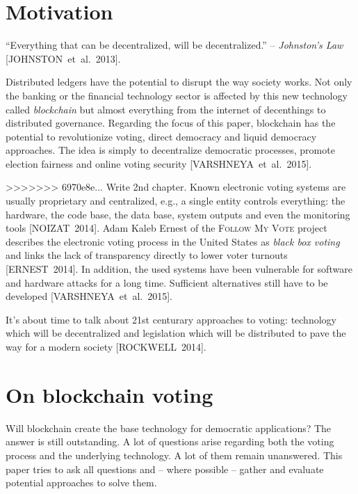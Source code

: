 \documentclass[9pt,oneside]{amsart}
\begin{document}
\begin{multicols}{2}
\section{Motivation}\label{sec:motivation}
\enquote{Everything that can be decentralized, will be decentralized.} -- \textit{Johnston's Law} [JOHNSTON~et~al.~2013].\par
Distributed ledgers have the potential to disrupt the way society works. Not only the banking or the financial technology sector is affected by this new technology called \textit{blockchain} but almost everything from the internet of decenthings to distributed governance. Regarding the focus of this paper, blockchain has the potential to revolutionize voting, direct democracy and liquid democracy approaches. The idea is simply to decentralize democratic processes, promote election fairness and online voting security [VARSHNEYA~et~al.~2015].\par
>>>>>>> 6970e8e... Write 2nd chapter.
Known electronic voting systems are usually proprietary and centralized, e.g., a single entity controls everything: the hardware, the code base, the data base, system outputs and even the monitoring tools [NOIZAT~2014]. Adam Kaleb Ernest of the \textsc{Follow My Vote} project describes the electronic voting process in the United States as \textit{black box voting} and links the lack of transparency directly to lower voter turnouts [ERNEST~2014]. In addition, the used systems have been vulnerable for software and hardware attacks for a long time. Sufficient alternatives still have to be developed [VARSHNEYA~et~al.~2015].\par
It's about time to talk about 21st centurary approaches to voting: technology which will be decentralized and legislation which will be distributed to pave the way for a modern society [ROCKWELL~2014].

\section{On blockchain voting}
Will blockchain create the base technology for democratic applications? The answer is still outstanding. A lot of questions arise regarding both the voting process and the underlying technology. A lot of them remain unanswered. This paper tries to ask all questions and -- where possible -- gather and evaluate potential approaches to solve them.


\end{multicols}
\end{document}
